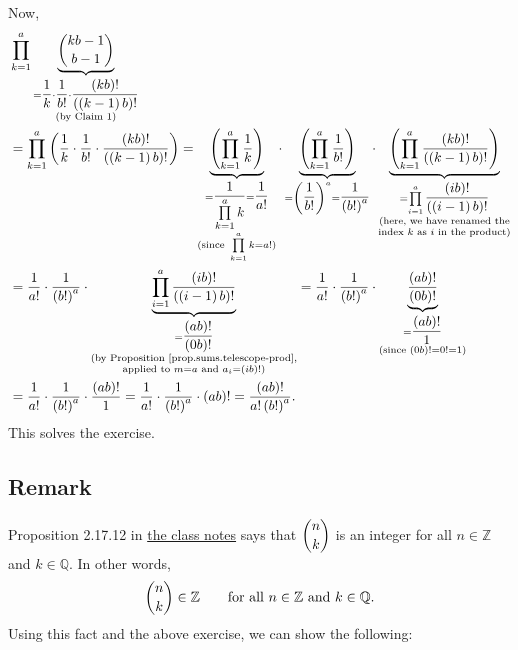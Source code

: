 \documentclass[paper=a4, fontsize=12pt]{scrartcl}%
\newcommand{\QQ}{\mathbb{Q}}
\newcommand{\ZZ}{\mathbb{Z}}
\let\prodnonlimits\prod
\renewcommand{\prod}{\prodnonlimits\limits}
\theoremstyle{plainsl}
\theoremstyle{definition}
\theoremstyle{remark}
\begin{document}
Now,
\begin{align*}
&  \prod_{k=1}^{a}\underbrace{\dbinom{kb-1}{b-1}}_{\substack{=\dfrac{1}%
{k}\cdot\dfrac{1}{b!}\cdot\dfrac{\left(  kb\right)  !}{\left(  \left(
k-1\right)  b\right)  !}\\\text{(by Claim 1)}}}\\
&  =\prod_{k=1}^{a}\left(  \dfrac{1}{k}\cdot\dfrac{1}{b!}\cdot\dfrac{\left(
kb\right)  !}{\left(  \left(  k-1\right)  b\right)  !}\right)
=\underbrace{\left(  \prod_{k=1}^{a}\dfrac{1}{k}\right)  }_{\substack{=\dfrac
{1}{\prod_{k=1}^{a}k}=\dfrac{1}{a!}\\\text{(since }\prod_{k=1}^{a}%
k=a!\text{)}}}\cdot\underbrace{\left(  \prod_{k=1}^{a}\dfrac{1}{b!}\right)
}_{=\left(  \dfrac{1}{b!}\right)  ^{a}=\dfrac{1}{\left(  b!\right)  ^{a}}%
}\cdot\underbrace{\left(  \prod_{k=1}^{a}\dfrac{\left(  kb\right)  !}{\left(
\left(  k-1\right)  b\right)  !}\right)  }_{\substack{=\prod_{i=1}^{a}%
\dfrac{\left(  ib\right)  !}{\left(  \left(  i-1\right)  b\right)
!}\\\text{(here, we have renamed the}\\\text{index }k\text{ as }i\text{ in the
product)}}}\\
&  =\dfrac{1}{a!}\cdot\dfrac{1}{\left(  b!\right)  ^{a}}\cdot\underbrace{\prod
_{i=1}^{a}\dfrac{\left(  ib\right)  !}{\left(  \left(  i-1\right)  b\right)
!}}_{\substack{=\dfrac{\left(  ab\right)  !}{\left(  0b\right)  !}\\\text{(by
Proposition \ref{prop.sums.telescope-prod},}\\\text{applied to }m=a\text{ and
}a_{i}=\left(  ib\right)  !\text{)}}}=\dfrac{1}{a!}\cdot\dfrac{1}{\left(
b!\right)  ^{a}}\cdot\underbrace{\dfrac{\left(  ab\right)  !}{\left(
0b\right)  !}}_{\substack{=\dfrac{\left(  ab\right)  !}{1}\\\text{(since
}\left(  0b\right)  !=0!=1\text{)}}}\\
&  =\dfrac{1}{a!}\cdot\dfrac{1}{\left(  b!\right)  ^{a}}\cdot\dfrac{\left(
ab\right)  !}{1}=\dfrac{1}{a!}\cdot\dfrac{1}{\left(  b!\right)  ^{a}}%
\cdot\left(  ab\right)  !=\dfrac{\left(  ab\right)  !}{a!\left(  b!\right)
^{a}}.
\end{align*}
This solves the exercise.

\subsection{Remark}

Proposition 2.17.12 in
\href{http://www.cip.ifi.lmu.de/~grinberg/t/19s/notes.pdf}{the class notes}
says that $\dbinom{n}{k}$ is an integer for all
$n \in \ZZ$ and $k \in \QQ$.
In other words,
\begin{align}
\dbinom{n}{k} \in \ZZ
\qquad \text{for all } n \in \ZZ \text{ and } k \in \QQ .
\label{sol.binom.102.rmk.nkinZ}
\end{align}
Using this fact and the above exercise, we can show the
following:
\end{document}

